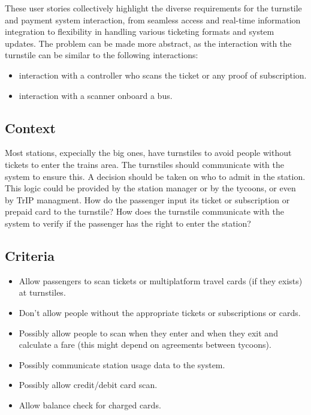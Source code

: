 These user stories collectively highlight the diverse requirements for the turnstile and payment system interaction, from seamless access and real-time information integration to flexibility in handling various ticketing formats and system updates.
The problem can be made more abstract, as the interaction with the turnstile can be similar to the following interactions:
\begin{itemize}
    \item interaction with a controller who scans the ticket or any proof of subscription.
    \item interaction with a scanner onboard a bus.
\end{itemize}

\subsection*{Context}

Most stations, expecially the big ones, have turnstiles to avoid people without tickets to enter the trains area.
The turnstiles should communicate with the system to ensure this. A decision should be taken on who to admit in the station.
This logic could be provided by the station manager or by the tycoons, or even by TrIP managment.
How do the passenger input its ticket or subscription or prepaid card to the turnstile?
How does the turnstile communicate with the system to verify if the passenger has the right to enter the station?

\subsection*{Criteria}
\begin{itemize}
    \item Allow passengers to scan tickets or multiplatform travel cards (if they exists) at turnstiles.
    \item Don't allow people without the appropriate tickets or subscriptions or cards.
    \item Possibly allow people to scan when they enter and when they exit and calculate a fare (this might depend on agreements between tycoons). 
    \item Possibly communicate station usage data to the system.
    \item Possibly allow credit/debit card scan.
    \item Allow balance check for charged cards.
\end{itemize}

